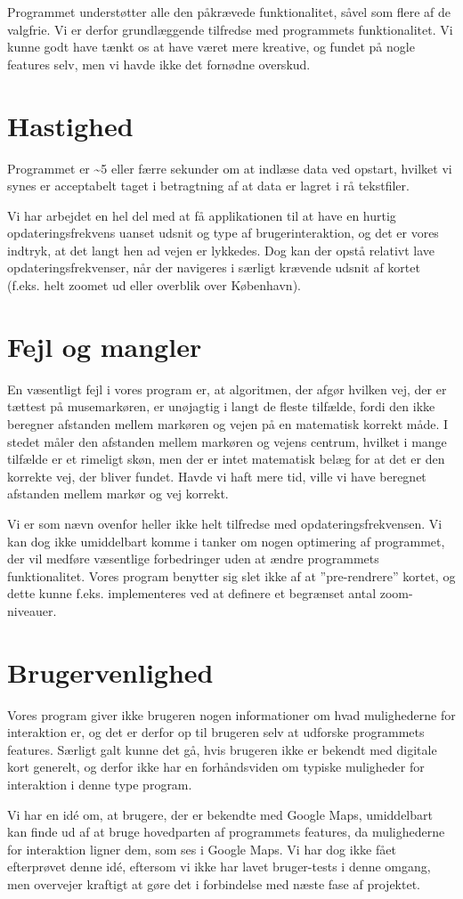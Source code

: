 Programmet understøtter alle den påkrævede funktionalitet, såvel som flere af de valgfrie. Vi er derfor grundlæggende tilfredse med programmets funktionalitet. Vi kunne godt have tænkt os at have været mere kreative, og fundet på nogle features selv, men vi havde ikke det fornødne overskud.

\section{Hastighed}

Programmet er \textasciitilde5 eller færre sekunder om at indlæse data ved opstart, hvilket vi synes er acceptabelt taget i betragtning af at data er lagret i rå tekstfiler.

Vi har arbejdet en hel del med at få applikationen til at have en hurtig opdateringsfrekvens uanset udsnit og type af brugerinteraktion, og det er vores indtryk, at det langt hen ad vejen er lykkedes. Dog kan der opstå relativt lave opdateringsfrekvenser, når der navigeres i særligt krævende udsnit af kortet (f.eks. helt zoomet ud eller overblik over København).

\section{Fejl og mangler}

En væsentligt fejl i vores program er, at algoritmen, der afgør hvilken vej, der er tættest på musemarkøren, er unøjagtig i langt de fleste tilfælde, fordi den ikke beregner afstanden mellem markøren og vejen på en matematisk korrekt måde. I stedet måler den afstanden mellem markøren og vejens centrum, hvilket i mange tilfælde er et rimeligt skøn, men der er intet matematisk belæg for at det er den korrekte vej, der bliver fundet. Havde vi haft mere tid, ville vi have beregnet afstanden mellem markør og vej korrekt.

Vi er som nævn ovenfor heller ikke helt tilfredse med opdateringsfrekvensen. Vi kan dog ikke umiddelbart komme i tanker om nogen optimering af programmet, der vil medføre væsentlige forbedringer uden at ændre programmets funktionalitet. Vores program benytter sig slet ikke af at ''pre-rendrere'' kortet, og dette kunne f.eks. implementeres ved at definere et begrænset antal zoom-niveauer.

\section{Brugervenlighed}

Vores program giver ikke brugeren nogen informationer om hvad mulighederne for interaktion er, og det er derfor op til brugeren selv at udforske programmets features. Særligt galt kunne det gå, hvis brugeren ikke er bekendt med digitale kort generelt, og derfor ikke har en forhåndsviden om typiske muligheder for interaktion i denne type program.

Vi har en idé om, at brugere, der er bekendte med Google Maps, umiddelbart kan finde ud af at bruge hovedparten af programmets features, da mulighederne for interaktion ligner dem, som ses i Google Maps. Vi har dog ikke fået efterprøvet denne idé, eftersom vi ikke har lavet bruger-tests i denne omgang, men overvejer kraftigt at gøre det i forbindelse med næste fase af projektet.